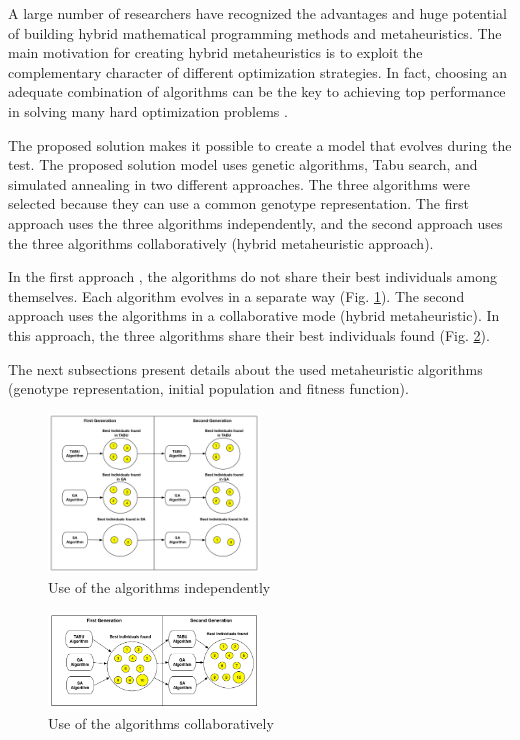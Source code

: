 \documentclass[conference]{IEEEtran}
\begin{document}
A large number of researchers have recognized the advantages and huge potential of building hybrid mathematical programming methods and metaheuristics. The main motivation for creating hybrid metaheuristics is to exploit the complementary character of different optimization strategies. In fact, choosing an adequate combination of algorithms can be the key to achieving top performance in solving many hard optimization problems \cite{Puchinger2005}.


The proposed solution makes it possible to create a model that evolves during the test. The proposed solution model uses genetic algorithms, Tabu search, and simulated annealing in two different approaches. The three algorithms were selected because they can use a common genotype representation. The first approach uses the three algorithms independently, and the second approach uses the three algorithms collaboratively (hybrid metaheuristic approach).

In the first approach , the algorithms do not share their best individuals among themselves. Each algorithm evolves in a separate way (Fig. \ref{fig:firstaproach}). The second approach uses the algorithms in a collaborative mode (hybrid metaheuristic). In this approach, the three algorithms share their best individuals found (Fig. \ref{fig:secondapproach}).

The next subsections present details about the used metaheuristic algorithms (genotype representation, initial population and fitness function).



\begin{figure}[h]
\includegraphics[width=0.5\textwidth]{./images/independ.png}
\caption{Use of the algorithms independently}
\label{fig:firstaproach}
\end{figure}
\begin{figure}
\includegraphics[width=0.5\textwidth]{./images/collaborative.png}
\caption{Use of the  algorithms collaboratively}
\label{fig:secondapproach}
\end{figure}
\end{document}

